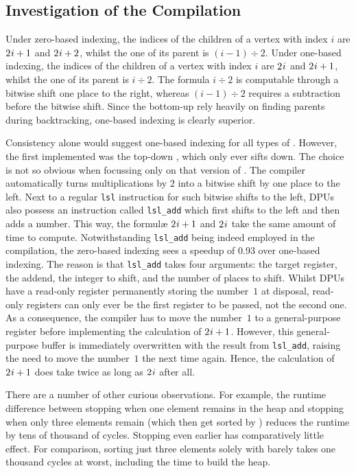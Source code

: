 \subsection{Investigation of the Compilation}
\label{sec:tasklet:heap:compilation}

Under zero-based indexing, the indices of the children of a vertex with index \(i\) are \(2 \mspace{1mu} i + 1\) and \(2 \mspace{1mu} i + 2\), whilst the one of its parent is \((i - 1) \div 2\).
Under one-based indexing, the indices of the children of a vertex with index \(i\) are \(2 \mspace{1mu} i\) and \(2 \mspace{1mu} i + 1\), whilst the one of its parent is \(i \div 2\).
The formula \(i \div 2\) is computable through a bitwise shift one place to the right, whereas \((i - 1) \div 2\) requires a subtraction before the bitwise shift.
Since the bottom-up \HS*{} rely heavily on finding parents during backtracking, one-based indexing is clearly superior.

Consistency alone would suggest one-based indexing for all types of \HS{}.
However, the first \HS{} implemented was the top-down \HS{}, which only ever sifts down.
The choice is not so obvious when focussing only on that version of \HS{}.
The compiler automatically turns multiplications by \(2\) into a bitwise shift by one place to the left.
Next to a regular \lstinline|lsl| instruction for such bitwise shifts to the left, \acp{DPU} also possess an instruction called \lstinline|lsl_add| which first shifts to the left and then adds a number.
This way, the formulæ \(2 \mspace{1mu} i + 1\) and \(2 \mspace{1mu} i\) take the same amount of time to compute.
Notwithstanding \lstinline|lsl_add| being indeed employed in the compilation, the zero-based indexing sees a speedup of \num{0.93} over one-based indexing.
The reason is that \lstinline|lsl_add| takes four arguments:
the target register, the addend, the integer to shift, and the number of places to shift.
Whilst \acp{DPU} have a read-only register permanently storing the number~\(1\) at disposal, read-only registers can only ever be the first register to be passed, not the second one.
As a consequence, the compiler has to move the number~\(1\) to a general-purpose register before implementing the calculation of \(2 \mspace{1mu} i + 1\).
However, this general-purpose buffer is immediately overwritten with the result from \lstinline|lsl_add|, raising the need to move the number~\(1\) the next time again.
Hence, the calculation of \(2 \mspace{1mu} i + 1\) does take twice as long as \(2 \mspace{1mu} i\) after all.

There are a number of other curious observations.
For example, the runtime difference between stopping \HS{} when one element remains in the heap and stopping \HS{} when only three elements remain (which then get sorted by \IS{}) reduces the runtime by tens of thousand of cycles.
Stopping \HS{} even earlier has comparatively little effect.
For comparison, sorting just three elements solely with \HS{} barely takes one thousand cycles at worst, including the time to build the heap.

